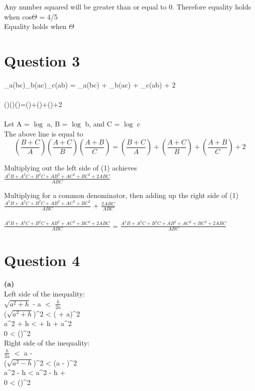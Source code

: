 \documentclass{beamer}     %
\begin{document}
Any number squared will be greater than or equal to 0.
Therefore equality holds when cos$\Theta$ = 4/5\\
Equality holds when $\Theta$ \degree

\section*{Question 3}
\log_{a}(bc)\log_{b}(ac)\log_{c}(ab) = \log_{a}(bc) + \log_{b}(ac) + \log_{c}(ab) + 2\\\\
()()()=()+()+()+2\\\\
Let A =  $\log$ a, B = $\log$ b, and C = $\log$ c\\
The above line is equal to \\
\begin{equation}
    (\frac{B+C}{A})(\frac{A+C}{B})(\frac{A+B}{C}) = (\frac{B+C}{A}) + (\frac{A+C}{B}) + (\frac{A+B}{C}) + 2
\end{equation}

Multiplying out the left side of (1) achieves\\
$\frac{A^2B + A^2C + B^2C + AB^2 + AC^2 + BC^2 + 2ABC}{ABC}$

Multiplying for a common denominator, then adding up the right side of (1)\\
$\frac{A^2B + A^2C + B^2C + AB^2 + AC^2 + BC^2}{ABC}$ + $\frac{2ABC}{ABC}$\\\\
$\frac{A^2B + A^2C + B^2C + AB^2 + AC^2 + BC^2 + 2ABC}{ABC}$ = $\frac{A^2B + A^2C + B^2C + AB^2 + AC^2 + BC^2 + 2ABC}{ABC}$

\section*{Question 4}
\textbf{(a)}\\
Left side of the inequality: \\
$\sqrt{a^2+h}$ - a $<$ $\frac{h}{2a}$\\
($\sqrt{a^2+h}$)^2  <  ( + a)^2\\
a^2 + h <  + h + a^2\\
0 < ()^2\\

Right side of the inequality: \\
$\frac{h}{2a}$ $<$ a - \\
($\sqrt{a^2 - h}$)^2 < (a - )^2\\
a^2 - h < a^2 - h + \\
0 < ()^2\\
\end{document}
